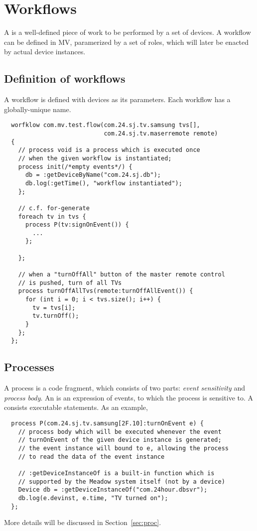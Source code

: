 \documentclass{note}
\begin{document}


\section{Workflows}
A  is a well-defined piece of work to be performed by a set of
devices. A workflow can be defined in MV, paramerized by a set of roles, which 
will later be enacted by actual device instances.

\subsection{Definition of workflows}
A workflow is defined with devices as its parameters.
Each workflow has a globally-unique name.
\begin{verbatim}
  worfklow com.mv.test.flow(com.24.sj.tv.samsung tvs[], 
                            com.24.sj.tv.maserremote remote)
  {
    // process void is a process which is executed once 
    // when the given workflow is instantiated;
    process init(/*empty events*/) {
      db = :getDeviceByName("com.24.sj.db");
      db.log(:getTime(), "workflow instantiated");
    };

    // c.f. for-generate 
    foreach tv in tvs {
      process P(tv:signOnEvent()) {
        ...
      };

    };

    // when a "turnOffAll" button of the master remote control
    // is pushed, turn of all TVs
    process turnOffAllTvs(remote:turnOffAllEvent()) {
      for (int i = 0; i < tvs.size(); i++) { 
        tv = tvs[i];
        tv.turnOff();
      }
    };
  };
\end{verbatim}


\subsection{Processes}
A process is a code fragment, which consists of two parts:
{\em event sensitivity\/} and {\em process body\/}. 
An  is an expression of events, 
to which the process is
sensitive to. A  consists executable statements.
As an example,
\begin{verbatim}
  process P(com.24.sj.tv.samsung[2F.10]:turnOnEvent e) {
    // process body which will be executed whenever the event
    // turnOnEvent of the given device instance is generated;
    // the event instance will bound to e, allowing the process
    // to read the data of the event instance

    // :getDeviceInstanceOf is a built-in function which is 
    // supported by the Meadow system itself (not by a device)
    Device db = :getDeviceInstanceOf("com.24hour.dbsvr");
    db.log(e.devinst, e.time, "TV turned on");
  };
\end{verbatim}
More details will be discussed in Section~\ref{sec:proc}.
\end{document}
